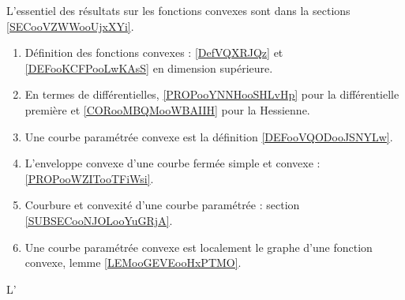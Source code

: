 
L'essentiel des résultats sur les fonctions convexes sont dans la sections \ref{SECooVZWWooUjxXYi}.

\begin{enumerate}
    \item
        Définition des fonctions convexes : \ref{DefVQXRJQz} et \ref{DEFooKCFPooLwKAsS} en dimension supérieure.
    \item 
        En termes de différentielles, \ref{PROPooYNNHooSHLvHp} pour la différentielle première et \ref{CORooMBQMooWBAIIH} pour la Hessienne.
    \item
        Une courbe paramétrée convexe est la définition \ref{DEFooVQODooJSNYLw}.
    \item
        L'enveloppe convexe d'une courbe fermée simple et convexe : \ref{PROPooWZITooTFiWsi}.
    \item 
        Courbure et convexité d'une courbe paramétrée : section \ref{SUBSECooNJOLooYuGRjA}.
    \item
        Une courbe paramétrée convexe est localement le graphe d'une fonction convexe, lemme \ref{LEMooGEVEooHxPTMO}.
\end{enumerate}

L'

